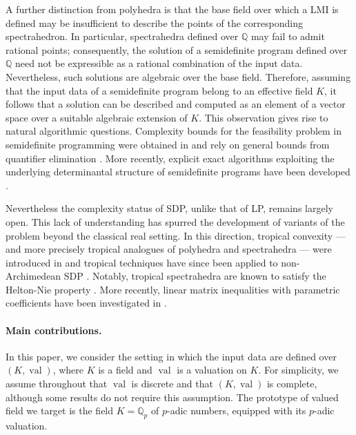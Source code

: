 \documentclass{elsarticle}
\theoremstyle{plain}
\theoremstyle{definition}
\DeclareMathOperator{\val}{val}
\def\QQ{\ensuremath{\mathbb{Q}}}
\begin{document}
A further distinction from polyhedra is that the base field over which a LMI is defined may be insufficient to describe the points of the corresponding spectrahedron. In particular, spectrahedra defined over $\QQ$ may fail to admit rational points; consequently, the solution of a semidefinite program defined over $\QQ$ need not be expressible as a rational combination of the input data. Nevertheless, such solutions are algebraic over the base field. Therefore, assuming that the input data of a semidefinite program belong to an effective field $K$, it follows that a solution can be described and computed as an element of a vector space over a suitable algebraic extension of $K$. This observation gives rise to natural algorithmic questions. Complexity bounds for the feasibility problem in semidefinite programming were obtained in \cite{porkolab1997complexity} and rely on general bounds from quantifier elimination \cite{renegar1992computational}. More recently, explicit exact algorithms exploiting the underlying determinantal structure of semidefinite programs have been developed \cite{henrion2016exact,NALDI2018206}.

Nevertheless the complexity status of SDP, unlike that of LP, remains largely
open. This lack of understanding has spurred the development of variants of the problem beyond the classical 
real setting.
In this direction, tropical convexity --- and more precisely tropical analogues of polyhedra and spectrahedra ---
were introduced in \cite{develin2004tropical,allamigeon_tropical_2020} and tropical techniques have since been applied to
non-Archimedean SDP \cite{allamigeon2016solving}. Notably, tropical spectrahedra are known to satisfy
the Helton-Nie property \cite{allamigeon2019tropical}. More recently, linear matrix inequalities with parametric coefficients
have been investigated in \cite{naldi2025solving}.

\paragraph{Main contributions.}
In this paper, we consider the setting in which the input data are defined over $(K,\val)$, where $K$ is a field and
$\val$ is a valuation on $K$. For simplicity, we assume throughout that $\val$ is discrete and that $(K,\val)$ is complete, although some results do not require this assumption. The prototype of valued field we target is the field $K=\QQ_p$ of $p$-adic numbers, equipped with its $p$-adic valuation.

\end{document}
